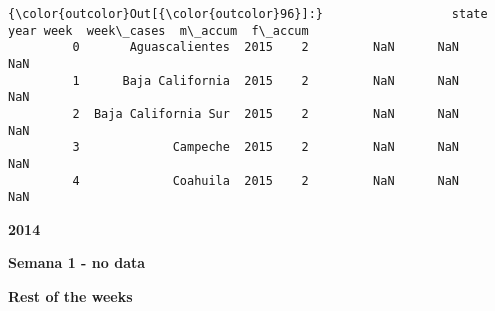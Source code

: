 \documentclass[11pt]{article}
\begin{document}
\begin{Verbatim}[commandchars=\\\{\}]
{\color{outcolor}Out[{\color{outcolor}96}]:}                  state  year week  week\_cases  m\_accum  f\_accum
         0       Aguascalientes  2015    2         NaN      NaN      NaN
         1      Baja California  2015    2         NaN      NaN      NaN
         2  Baja California Sur  2015    2         NaN      NaN      NaN
         3             Campeche  2015    2         NaN      NaN      NaN
         4             Coahuila  2015    2         NaN      NaN      NaN
\end{Verbatim}
            
    \textbf{2014}

    \textbf{Semana 1 - no data}

    \textbf{Rest of the weeks}
\end{document}
